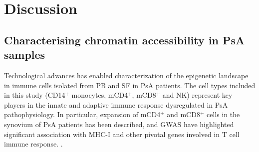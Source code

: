 
 

\section{Discussion}


\subsection{Characterising chromatin accessibility in PsA samples}
Technological advances has enabled characterization of the epigenetic landscape in immune cells isolated from PB and SF in PsA patients. The cell types included in this study (CD14$^+$ monocytes, mCD4$^+$, mCD8$^+$ and NK) represent key players in the innate and adaptive immune response dysregulated in PsA pathophysiology. In particular, expansion of mCD4$^+$ and mCD8$^+$ cells in the synovium of PsA patients has been described, and GWAS have highlighted significant association with MHC-I and other pivotal genes involved in T cell immune response. \parencite{Taams2018}.

